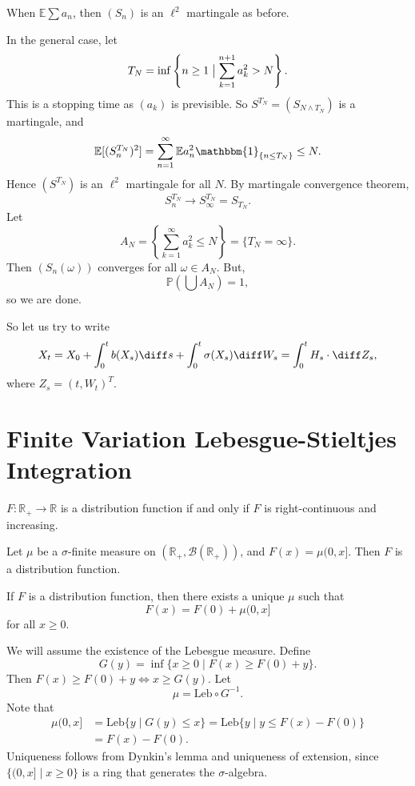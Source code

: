 \documentclass[12pt]{article}
\begin{document}
\begin{proofbox}
	When $\mathbb{E} \sum a_n$, then $(S_n)$ is an $\ell^2$ martingale as before.

	In the general case, let
	\[
		T_N = \inf \left\{n \geq 1 \bigm| \sum_{k = 1}^{n+1} a_k^2 > N \right\}.
	\]
	This is a stopping time as $(a_k)$ is previsible. So $S^{T_N} = (S_{N \wedge T_N})$ is a martingale, and
	\[
		\mathbb{E}[(S_n^{T_N})^2] = \sum_{n = 1}^\infty \mathbb{E} a_n^2 \mathbbm{1}_{\{n \leq T_N\}} \leq N.
	\]
	Hence $(S^{T_N})$ is an $\ell^2$ martingale for all $N$. By martingale convergence theorem,
	\[
	S_n^{T_N} \to S_\infty^{T_N} = S_{T_N}.
	\]
	Let
	\[
		A_N = \left\{ \sum_{k = 1}^\infty a_k^2 \leq N\right\} = \{T_N = \infty\}.
	\]
	Then $(S_n(\omega))$ converges for all $\omega \in A_N$. But,
	\[
	\mathbb{P}\left( \bigcup A_N\right) = 1,
	\]
	so we are done.
\end{proofbox}


So let us try to write
\[
X_t = X_0 + \int_0^t b(X_s) \diff s + \int_0^t \sigma(X_s) \diff W_s = \int_0^t H_s \cdot \diff Z_s,
\]
where $Z_s = (t, W_t)^{T}$.

\newpage

\section{Finite Variation Lebesgue-Stieltjes Integration}%
\label{sec:fvlsi}

\begin{definition}
	$F : \mathbb{R}_+ \to \mathbb{R}$ is a distribution function if and only if $F$ is right-continuous and increasing.
\end{definition}

\begin{exbox}
	Let $\mu$ be a $\sigma$-finite measure on $(\mathbb{R}_+, \mathcal{B}(\mathbb{R}_+))$, and $F(x) = \mu(0, x]$. Then $F$ is a distribution function.
\end{exbox}

\begin{proposition}
	If $F$ is a distribution function, then there exists a unique $\mu$ such that
	\[
		F(x) = F(0) + \mu(0, x]
	\]
	for all $x \geq 0$.
\end{proposition}

\begin{proofbox}
	We will assume the existence of the Lebesgue measure. Define
	\[
		G(y) = \inf \{ x \geq 0 \mid F(x) \geq F(0) + y\}.
	\]
	Then $F(x) \geq F(0) + y \iff x \geq G(y)$. Let
	\[
	\mu = \mathrm{Leb} \circ G^{-1}.
	\]
	Note that
	\begin{align*}
		\mu(0, x] &= \mathrm{Leb}\{y \mid G(y) \leq x\} = \mathrm{Leb}\{y \mid y \leq F(x) - F(0)\} \\
			  &= F(x) - F(0).
	\end{align*}
	Uniqueness follows from Dynkin's lemma and uniqueness of extension, since $\{(0, x] \mid x \geq 0\}$ is a ring that generates the $\sigma$-algebra.
\end{proofbox}
\end{document}

